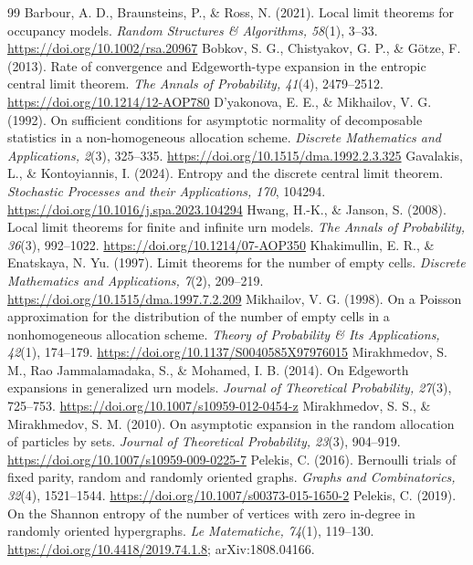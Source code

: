 \documentclass[11pt,a4paper]{article}
\theoremstyle{definition}\newtheorem{remark}[theorem]{Remark}\newtheorem{conjecture}{Conjecture}
\begin{document}
\begin{thebibliography}{99}
 Barbour, A. D., Braunsteins, P., \& Ross, N. (2021). Local limit theorems for occupancy models. \emph{Random Structures \& Algorithms, 58}(1), 3--33. \url{https://doi.org/10.1002/rsa.20967}
 Bobkov, S. G., Chistyakov, G. P., \& G\"otze, F. (2013). Rate of convergence and Edgeworth-type expansion in the entropic central limit theorem. \emph{The Annals of Probability, 41}(4), 2479--2512. \url{https://doi.org/10.1214/12-AOP780}
 D'yakonova, E. E., \& Mikhailov, V. G. (1992). On sufficient conditions for asymptotic normality of decomposable statistics in a non-homogeneous allocation scheme. \emph{Discrete Mathematics and Applications, 2}(3), 325--335. \url{https://doi.org/10.1515/dma.1992.2.3.325}
 Gavalakis, L., \& Kontoyiannis, I. (2024). Entropy and the discrete central limit theorem. \emph{Stochastic Processes and their Applications, 170}, 104294. \url{https://doi.org/10.1016/j.spa.2023.104294}
 Hwang, H.-K., \& Janson, S. (2008). Local limit theorems for finite and infinite urn models. \emph{The Annals of Probability, 36}(3), 992--1022. \url{https://doi.org/10.1214/07-AOP350}
 Khakimullin, E. R., \& Enatskaya, N. Yu. (1997). Limit theorems for the number of empty cells. \emph{Discrete Mathematics and Applications, 7}(2), 209--219. \url{https://doi.org/10.1515/dma.1997.7.2.209}
 Mikhailov, V. G. (1998). On a Poisson approximation for the distribution of the number of empty cells in a nonhomogeneous allocation scheme. \emph{Theory of Probability \& Its Applications, 42}(1), 174--179. \url{https://doi.org/10.1137/S0040585X97976015}
 Mirakhmedov, S. M., Rao Jammalamadaka, S., \& Mohamed, I. B. (2014). On Edgeworth expansions in generalized urn models. \emph{Journal of Theoretical Probability, 27}(3), 725--753. \url{https://doi.org/10.1007/s10959-012-0454-z}
 Mirakhmedov, S. S., \& Mirakhmedov, S. M. (2010). On asymptotic expansion in the random allocation of particles by sets. \emph{Journal of Theoretical Probability, 23}(3), 904--919. \url{https://doi.org/10.1007/s10959-009-0225-7}
 Pelekis, C. (2016). Bernoulli trials of fixed parity, random and randomly oriented graphs. \emph{Graphs and Combinatorics, 32}(4), 1521--1544. \url{https://doi.org/10.1007/s00373-015-1650-2}
 Pelekis, C. (2019). On the Shannon entropy of the number of vertices with zero in-degree in randomly oriented hypergraphs. \emph{Le Matematiche, 74}(1), 119--130. \url{https://doi.org/10.4418/2019.74.1.8}; arXiv:1808.04166.

\end{thebibliography}
\end{document}
